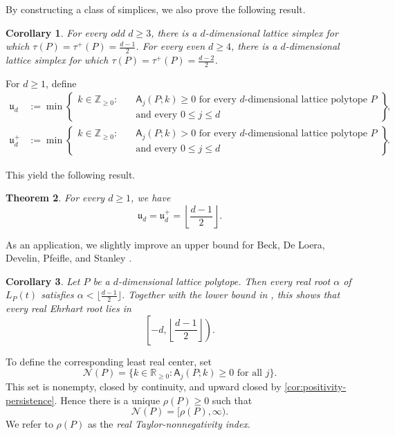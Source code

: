 \documentclass[reqno, 12pt]{article}
\numberwithin{equation}{section}
\newtheorem{theorem}{Theorem}[section]
\newtheorem{corollary}[theorem]{Corollary}
\theoremstyle{definition}
\newcommand{\R}{\mathbb{R}}
\newcommand{\N}{\mathbb{Z}_{\geq 0}}
\newcommand{\A}{\mathsf{A}}
\begin{document}
By constructing a class of simplices, we also prove the following result.
\begin{corollary}\label{Introduction-Cor-ODD-EVEN}
For every odd $d\geq3$, there is a $d$-dimensional lattice simplex for which $\tau(P)=\tau^+(P)=\frac{d-1}{2}$.
For every even $d\geq4$, there is a $d$-dimensional lattice simplex for which $\tau(P)=\tau^+(P)=\frac{d-2}{2}$.
\end{corollary}

For $d\geq1$, define
\begin{align*}
\mathfrak u_d&:=\min\left\{
\begin{aligned}
k\in\N:\quad&\A_j(P;k)\geq0\text{ for every }d\text{-dimensional lattice polytope }P\\[-2pt]
&\text{and every }0\leq j\leq d
\end{aligned}\right\},
\\
\mathfrak u_d^+&:=\min\left\{
\begin{aligned}
k\in\N:\quad&\A_j(P;k)>0\text{ for every }d\text{-dimensional lattice polytope }P\\[-2pt]
&\text{and every }0\leq j\leq d
\end{aligned}\right\}.
\end{align*}

This yield the following result.
\begin{theorem}\label{Intorodct-Two}
For every $d\geq1$, we have 
\[\mathfrak u_d=\mathfrak u_d^+=\left\lfloor\frac{d-1}{2}\right\rfloor.
\]
\end{theorem}

As an application, we slightly improve an upper bound for Beck, De Loera, Develin, Pfeifle, and Stanley \cite{BeckEtAl2005}.
\begin{corollary}\label{Intorodct-Three}
Let $P$ be a $d$-dimensional lattice polytope.  Then every real root $\alpha$ of $L_P(t)$ satisfies $\alpha<\lfloor\frac{d-1}{2}\rfloor$. Together with the lower bound in
\cite[Theorem~1.2(b)]{BeckEtAl2005}, this shows that every real Ehrhart root lies in
\[\left[-d,\left\lfloor\frac{d-1}{2}\right\rfloor\right).
\]
\end{corollary}


To define the corresponding least real center, set
\[\mathcal N(P)=\{k\in\R_{\geq0}:\A_j(P;k)\geq0\text{ for all }j\}.
\]
This set is nonempty, closed by continuity, and upward closed by \cref{cor:positivity-persistence}.  Hence there is a unique $\rho(P)\geq0$ such that
\begin{equation}\label{eq:real-positivity-ray}
\mathcal N(P)=[\rho(P),\infty).
\end{equation}
We refer to $\rho(P)$ as the \emph{real Taylor-nonnegativity index}.
\end{document}
